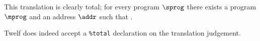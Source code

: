 This translation is clearly total; for every \slang program $\sprog$ there exists a \mlang program $\mprog$ and an address $\addr$ such that \trasmfinal{\sprog}{\mprog}{\addr}.


\Twelf
Twelf does indeed accept a \texttt{\%total} declaration on the translation judgement.
